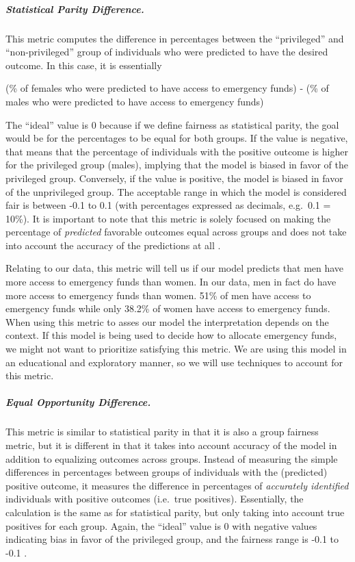 \documentclass[water,article,submit,moreauthors,pdftex]{mdpi}
\begin{document}
\hypertarget{statistical-parity-difference.}{%
\subparagraph{Statistical Parity
Difference.}\label{statistical-parity-difference.}}

This metric computes the difference in percentages between the
``privileged'' and ``non-privileged'' group of individuals who were
predicted to have the desired outcome. In this case, it is essentially

(\% of females who were predicted to have access to emergency funds) -
(\% of males who were predicted to have access to emergency funds)

The ``ideal'' value is 0 because if we define fairness as statistical
parity, the goal would be for the percentages to be equal for both
groups. If the value is negative, that means that the percentage of
individuals with the positive outcome is higher for the privileged group
(males), implying that the model is biased in favor of the privileged
group. Conversely, if the value is positive, the model is biased in
favor of the unprivileged group. The acceptable range in which the model
is considered fair is between -0.1 to 0.1 (with percentages expressed as
decimals, e.g.~0.1 = 10\%). It is important to note that this metric is
solely focused on making the percentage of \emph{predicted} favorable
outcomes equal across groups and does not take into account the accuracy
of the predictions at all \citep{caton2020fairness, kypraiou_what_2021}.

Relating to our data, this metric will tell us if our model predicts
that men have more access to emergency funds than women. In our data,
men in fact do have more access to emergency funds than women. 51\% of
men have access to emergency funds while only 38.2\% of women have
access to emergency funds. When using this metric to asses our model the
interpretation depends on the context. If this model is being used to
decide how to allocate emergency funds, we might not want to prioritize
satisfying this metric. We are using this model in an educational and
exploratory manner, so we will use techniques to account for this
metric.

\hypertarget{equal-opportunity-difference.}{%
\subparagraph{Equal Opportunity
Difference.}\label{equal-opportunity-difference.}}

This metric is similar to statistical parity in that it is also a group
fairness metric, but it is different in that it takes into account
accuracy of the model in addition to equalizing outcomes across groups.
Instead of measuring the simple differences in percentages between
groups of individuals with the (predicted) positive outcome, it measures
the difference in percentages of \emph{accurately identified}
individuals with positive outcomes (i.e.~true positives). Essentially,
the calculation is the same as for statistical parity, but only taking
into account true positives for each group. Again, the ``ideal'' value
is 0 with negative values indicating bias in favor of the privileged
group, and the fairness range is -0.1 to -0.1 \citep{caton2020fairness}.
\end{document}
